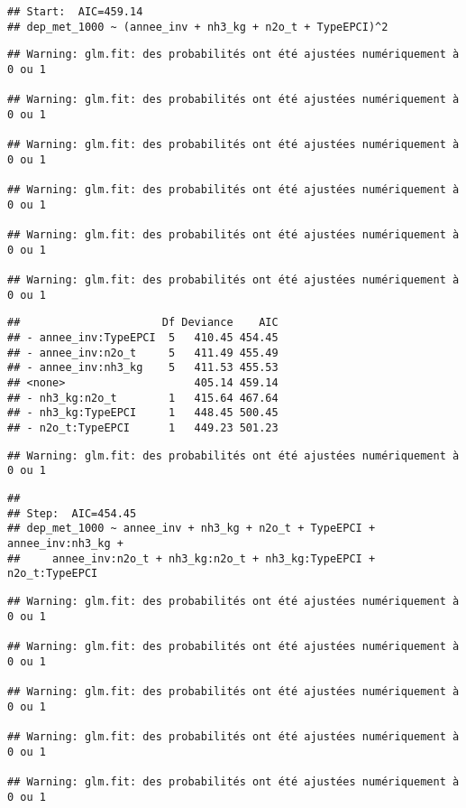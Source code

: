 \documentclass[
]{article}
\begin{document}
\begin{verbatim}
## Start:  AIC=459.14
## dep_met_1000 ~ (annee_inv + nh3_kg + n2o_t + TypeEPCI)^2
\end{verbatim}

\begin{verbatim}
## Warning: glm.fit: des probabilités ont été ajustées numériquement à 0 ou 1

## Warning: glm.fit: des probabilités ont été ajustées numériquement à 0 ou 1

## Warning: glm.fit: des probabilités ont été ajustées numériquement à 0 ou 1

## Warning: glm.fit: des probabilités ont été ajustées numériquement à 0 ou 1

## Warning: glm.fit: des probabilités ont été ajustées numériquement à 0 ou 1

## Warning: glm.fit: des probabilités ont été ajustées numériquement à 0 ou 1
\end{verbatim}

\begin{verbatim}
##                      Df Deviance    AIC
## - annee_inv:TypeEPCI  5   410.45 454.45
## - annee_inv:n2o_t     5   411.49 455.49
## - annee_inv:nh3_kg    5   411.53 455.53
## <none>                    405.14 459.14
## - nh3_kg:n2o_t        1   415.64 467.64
## - nh3_kg:TypeEPCI     1   448.45 500.45
## - n2o_t:TypeEPCI      1   449.23 501.23
\end{verbatim}

\begin{verbatim}
## Warning: glm.fit: des probabilités ont été ajustées numériquement à 0 ou 1
\end{verbatim}

\begin{verbatim}
## 
## Step:  AIC=454.45
## dep_met_1000 ~ annee_inv + nh3_kg + n2o_t + TypeEPCI + annee_inv:nh3_kg + 
##     annee_inv:n2o_t + nh3_kg:n2o_t + nh3_kg:TypeEPCI + n2o_t:TypeEPCI
\end{verbatim}

\begin{verbatim}
## Warning: glm.fit: des probabilités ont été ajustées numériquement à 0 ou 1

## Warning: glm.fit: des probabilités ont été ajustées numériquement à 0 ou 1

## Warning: glm.fit: des probabilités ont été ajustées numériquement à 0 ou 1

## Warning: glm.fit: des probabilités ont été ajustées numériquement à 0 ou 1

## Warning: glm.fit: des probabilités ont été ajustées numériquement à 0 ou 1
\end{verbatim}
\end{document}
